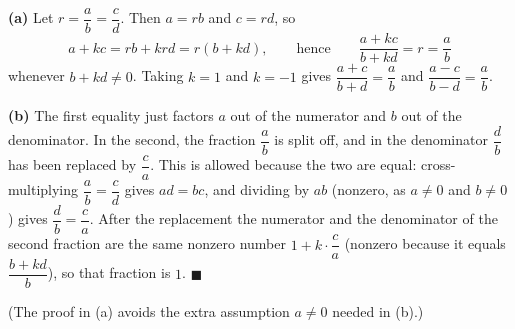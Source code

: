 \textbf{(a)} Let $r=\dfrac {a}{b}=\dfrac {c}{d}$. Then $a=rb$ and $c=rd$, so
\[
a+kc=rb+krd=r(b+kd),\qquad\text{hence}\qquad\dfrac{a+kc}{b+kd}=r=\dfrac {a}{b}
\]
whenever $b+kd\ne0$. Taking $k=1$ and $k=-1$ gives $\dfrac{a+c}{b+d}=\dfrac {a}{b}$ and $\dfrac{a-c}{b-d}=\dfrac {a}{b}$.

\textbf{(b)} The first equality just factors $a$ out of the numerator and $b$ out of the denominator. In the second, the fraction $\dfrac{a}{b}$ is split off, and in the denominator $\dfrac {d}{b}$ has been replaced by $\dfrac {c}{a}$. This is allowed because the two are equal: cross-multiplying $\dfrac {a}{b}=\dfrac {c}{d}$ gives $ad=bc$, and dividing by $ab$ (nonzero, as $a\ne0$ and $b\ne0$) gives $\dfrac {d}{b}=\dfrac {c}{a}$. After the replacement the numerator and the denominator of the second fraction are the same nonzero number $1+k\cdot\dfrac {c}{a}$ (nonzero because it equals $\dfrac{b+kd}{b}$), so that fraction is $1$. $\blacksquare$

(The proof in (a) avoids the extra assumption $a\ne0$ needed in (b).)
